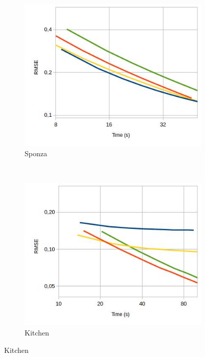 \begin{figure}[H]

\centering

\begin{subfigure}[h]{0.45\textwidth}
\includegraphics[width=\textwidth]{img/sponzaImgq.jpg}
\caption{\label{img:sponzaImgq} Sponza}
\end{subfigure}
~
\begin{subfigure}[h]{0.45\textwidth}
\includegraphics[width=\textwidth]{img/kitchenImgq.jpg}
\caption{\label{img:kitchenImgq} Kitchen}
\end{subfigure}


\end{figure}
